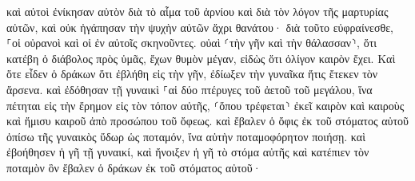 \documentclass{openreader}
\begin{document}
καὶ αὐτοὶ ἐνίκησαν αὐτὸν διὰ τὸ αἷμα τοῦ ἀρνίου καὶ διὰ τὸν λόγον τῆς μαρτυρίας αὐτῶν, καὶ οὐκ ἠγάπησαν τὴν ψυχὴν αὐτῶν ἄχρι θανάτου· 
διὰ τοῦτο εὐφραίνεσθε, ⸀οἱ οὐρανοὶ καὶ οἱ ἐν αὐτοῖς σκηνοῦντες. οὐαὶ ⸂τὴν γῆν καὶ τὴν θάλασσαν⸃, ὅτι κατέβη ὁ διάβολος πρὸς ὑμᾶς, ἔχων θυμὸν μέγαν, εἰδὼς ὅτι ὀλίγον καιρὸν ἔχει. 
Καὶ ὅτε εἶδεν ὁ δράκων ὅτι ἐβλήθη εἰς τὴν γῆν, ἐδίωξεν τὴν γυναῖκα ἥτις ἔτεκεν τὸν ἄρσενα. 
καὶ ἐδόθησαν τῇ γυναικὶ ⸀αἱ δύο πτέρυγες τοῦ ἀετοῦ τοῦ μεγάλου, ἵνα πέτηται εἰς τὴν ἔρημον εἰς τὸν τόπον αὐτῆς, ⸂ὅπου τρέφεται⸃ ἐκεῖ καιρὸν καὶ καιροὺς καὶ ἥμισυ καιροῦ ἀπὸ προσώπου τοῦ ὄφεως. 
καὶ ἔβαλεν ὁ ὄφις ἐκ τοῦ στόματος αὐτοῦ ὀπίσω τῆς γυναικὸς ὕδωρ ὡς ποταμόν, ἵνα αὐτὴν ποταμοφόρητον ποιήσῃ. 
καὶ ἐβοήθησεν ἡ γῆ τῇ γυναικί, καὶ ἤνοιξεν ἡ γῆ τὸ στόμα αὐτῆς καὶ κατέπιεν τὸν ποταμὸν ὃν ἔβαλεν ὁ δράκων ἐκ τοῦ στόματος αὐτοῦ· 
\end{document}
